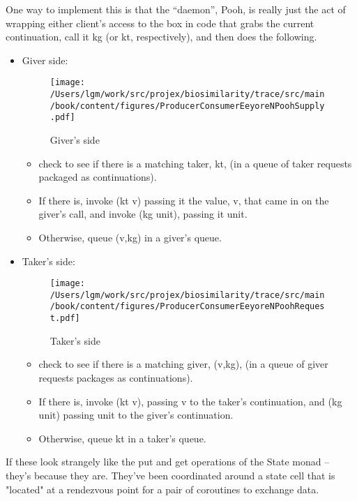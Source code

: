 One way to implement this is that the ``daemon'', Pooh, is really just
the act of wrapping either client's access to the box in code that
grabs the current continuation, call it kg (or kt, respectively), and
then does the following.  
\begin{itemize}
  \item Giver side: 
    \begin{figure}[tbp]
      \begin{center}
        { \texttt{[image: /Users/lgm/work/src/projex/biosimilarity/trace/src/main/book/content/figures/ProducerConsumerEeyoreNPoohSupply.pdf]} }
        \caption{ Giver's side }
      \end{center}
    \end{figure}
    \begin{itemize} 
    \item check to see if there is a matching taker, kt, (in a queue
      of taker requests packaged as continuations). 
    \item If there is, invoke (kt v) passing it the value, v, that
      came in on the giver's call, and invoke (kg unit), passing it
      unit. 
    \item Otherwise, queue (v,kg) in a giver's queue.
    \end{itemize}
  \item Taker's side:
    \begin{figure}[tbp]
      \begin{center}
        { \texttt{[image: /Users/lgm/work/src/projex/biosimilarity/trace/src/main/book/content/figures/ProducerConsumerEeyoreNPoohRequest.pdf]} }
        \caption{ Taker's side }
      \end{center}
    \end{figure}
    \begin{itemize}
    \item check to see if there is a matching giver, (v,kg),
      (in a queue of giver requests packages as continuations).
    \item If there is, invoke (kt v), passing v to the taker's
      continuation, and (kg unit) passing unit to the giver's
      continuation.
    \item Otherwise, queue kt in a taker's queue.
  \end{itemize}
\end{itemize}

If these look strangely like the put and get operations of the State
monad -- they's because they are. They've been coordinated around a
state cell that is "located" at a rendezvous point for a pair of
coroutines to exchange data.

